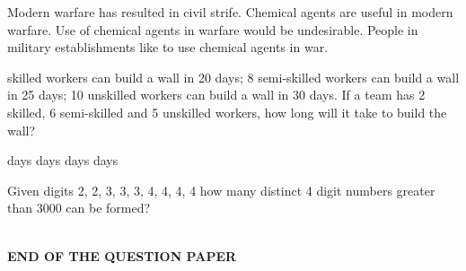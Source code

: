 \documentclass{exam}
\begin{document}
\begin{questions}
\begin{oneparchoices}
	\choice Modern warfare has resulted in civil strife.
	\choice Chemical agents are useful in modern warfare.
	\choice Use of chemical agents in warfare would be undesirable.
	\choice People in military establishments like to use chemical agents in war.
\end{oneparchoices}

 skilled workers can build a wall in 20 days; 8 semi-skilled workers can build a wall in 25 days; 10 unskilled workers can build a wall in 30 days. If a team has 2 skilled, 6 semi-skilled and 5 unskilled workers, how long will it take to build the wall?\hfill{}

\begin{oneparchoices}
	 days  days  days  days
\end{oneparchoices}

\question Given digits 2, 2, 3, 3, 3, 4, 4, 4, 4 how many distinct 4 digit numbers greater than 3000 can be formed?\hfill{}

\begin{oneparchoices}
	   
\end{oneparchoices}
\end{questions}

\begin{center}
	\hrulefill\\
	\textbf{END OF THE QUESTION PAPER}
\end{center}
\end{document}
